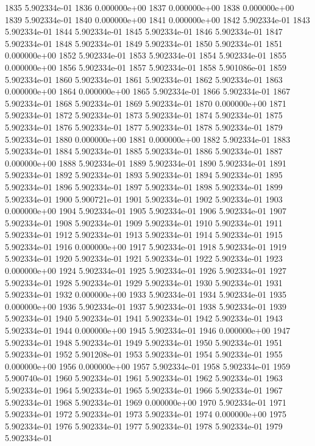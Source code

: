 \documentclass{article}
\begin{document}
\begin{Schunk}
\begin{Soutput}
1835 5.902334e-01
1836 0.000000e+00
1837 0.000000e+00
1838 0.000000e+00
1839 5.902334e-01
1840 0.000000e+00
1841 0.000000e+00
1842 5.902334e-01
1843 5.902334e-01
1844 5.902334e-01
1845 5.902334e-01
1846 5.902334e-01
1847 5.902334e-01
1848 5.902334e-01
1849 5.902334e-01
1850 5.902334e-01
1851 0.000000e+00
1852 5.902334e-01
1853 5.902334e-01
1854 5.902334e-01
1855 0.000000e+00
1856 5.902334e-01
1857 5.902334e-01
1858 5.901086e-01
1859 5.902334e-01
1860 5.902334e-01
1861 5.902334e-01
1862 5.902334e-01
1863 0.000000e+00
1864 0.000000e+00
1865 5.902334e-01
1866 5.902334e-01
1867 5.902334e-01
1868 5.902334e-01
1869 5.902334e-01
1870 0.000000e+00
1871 5.902334e-01
1872 5.902334e-01
1873 5.902334e-01
1874 5.902334e-01
1875 5.902334e-01
1876 5.902334e-01
1877 5.902334e-01
1878 5.902334e-01
1879 5.902334e-01
1880 0.000000e+00
1881 0.000000e+00
1882 5.902334e-01
1883 5.902334e-01
1884 5.902334e-01
1885 5.902334e-01
1886 5.902334e-01
1887 0.000000e+00
1888 5.902334e-01
1889 5.902334e-01
1890 5.902334e-01
1891 5.902334e-01
1892 5.902334e-01
1893 5.902334e-01
1894 5.902334e-01
1895 5.902334e-01
1896 5.902334e-01
1897 5.902334e-01
1898 5.902334e-01
1899 5.902334e-01
1900 5.900721e-01
1901 5.902334e-01
1902 5.902334e-01
1903 0.000000e+00
1904 5.902334e-01
1905 5.902334e-01
1906 5.902334e-01
1907 5.902334e-01
1908 5.902334e-01
1909 5.902334e-01
1910 5.902334e-01
1911 5.902334e-01
1912 5.902334e-01
1913 5.902334e-01
1914 5.902334e-01
1915 5.902334e-01
1916 0.000000e+00
1917 5.902334e-01
1918 5.902334e-01
1919 5.902334e-01
1920 5.902334e-01
1921 5.902334e-01
1922 5.902334e-01
1923 0.000000e+00
1924 5.902334e-01
1925 5.902334e-01
1926 5.902334e-01
1927 5.902334e-01
1928 5.902334e-01
1929 5.902334e-01
1930 5.902334e-01
1931 5.902334e-01
1932 0.000000e+00
1933 5.902334e-01
1934 5.902334e-01
1935 0.000000e+00
1936 5.902334e-01
1937 5.902334e-01
1938 5.902334e-01
1939 5.902334e-01
1940 5.902334e-01
1941 5.902334e-01
1942 5.902334e-01
1943 5.902334e-01
1944 0.000000e+00
1945 5.902334e-01
1946 0.000000e+00
1947 5.902334e-01
1948 5.902334e-01
1949 5.902334e-01
1950 5.902334e-01
1951 5.902334e-01
1952 5.901208e-01
1953 5.902334e-01
1954 5.902334e-01
1955 0.000000e+00
1956 0.000000e+00
1957 5.902334e-01
1958 5.902334e-01
1959 5.900740e-01
1960 5.902334e-01
1961 5.902334e-01
1962 5.902334e-01
1963 5.902334e-01
1964 5.902334e-01
1965 5.902334e-01
1966 5.902334e-01
1967 5.902334e-01
1968 5.902334e-01
1969 0.000000e+00
1970 5.902334e-01
1971 5.902334e-01
1972 5.902334e-01
1973 5.902334e-01
1974 0.000000e+00
1975 5.902334e-01
1976 5.902334e-01
1977 5.902334e-01
1978 5.902334e-01
1979 5.902334e-01

\end{Soutput}
\end{Schunk}
\end{document}
